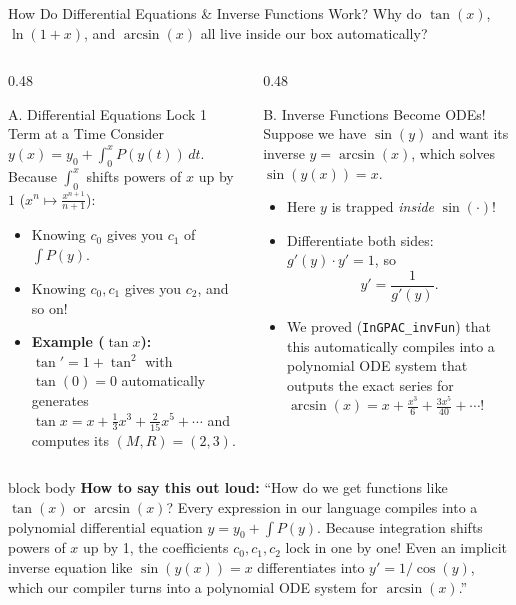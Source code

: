 \documentclass[aspectratio=169,11pt]{beamer}
\newcommand{\say}[1]{%
  \vfill
  \begin{beamercolorbox}[sep=5pt,rounded=true,shadow=false]{block body}
  {\footnotesize \textbf{\textcolor{deepblue}{How to say this out loud:}} ``#1''}
  \end{beamercolorbox}
}
\begin{document}
\begin{frame}[shrink=6]{How Do Differential Equations \& Inverse Functions Work?}
  Why do $\tan(x)$, $\ln(1+x)$, and $\arcsin(x)$ all live inside our box automatically?

  \begin{columns}[T]
    \begin{column}{0.48\textwidth}
      \begin{block}{A. Differential Equations Lock 1 Term at a Time}
        Consider $y(x) = y_0 + \int_0^x P(y(t))\,dt$.
        Because $\int_0^x$ shifts powers of $x$ up by $1$ ($x^n \mapsto \frac{x^{n+1}}{n+1}$):
        \begin{itemize}
          \item Knowing $c_0$ gives you $c_1$ of $\int P(y)$.
          \item Knowing $c_0, c_1$ gives you $c_2$, and so on!
          \item \textbf{Example ($\tan x$):} $\tan' = 1 + \tan^2$ with $\tan(0)=0$ automatically generates $\tan x = x + \frac{1}{3}x^3 + \frac{2}{15}x^5 + \cdots$ and computes its $(M,R) = (2,3)$.
        \end{itemize}
      \end{block}
    \end{column}
    \begin{column}{0.48\textwidth}
      \begin{block}{B. Inverse Functions Become ODEs!}
        Suppose we have $\sin(y)$ and want its inverse $y = \arcsin(x)$, which solves $\sin(y(x)) = x$.
        \begin{itemize}
          \item Here $y$ is trapped \emph{inside} $\sin(\cdot)$!
          \item Differentiate both sides: $g'(y) \cdot y' = 1$, so
            $$y' = \frac{1}{g'(y)}.$$
          \item We proved (\texttt{InGPAC\_invFun}) that this automatically compiles into a polynomial ODE system that outputs the exact series for $\arcsin(x) = x + \frac{x^3}{6} + \frac{3x^5}{40} + \cdots$!
        \end{itemize}
      \end{block}
    \end{column}
  \end{columns}

  \say{How do we get functions like $\tan(x)$ or $\arcsin(x)$? Every expression in our language compiles into a polynomial differential equation $y = y_0 + \int P(y)$. Because integration shifts powers of $x$ up by 1, the coefficients $c_0, c_1, c_2$ lock in one by one! Even an implicit inverse equation like $\sin(y(x)) = x$ differentiates into $y' = 1/\cos(y)$, which our compiler turns into a polynomial ODE system for $\arcsin(x)$.}
\end{frame}
\end{document}
